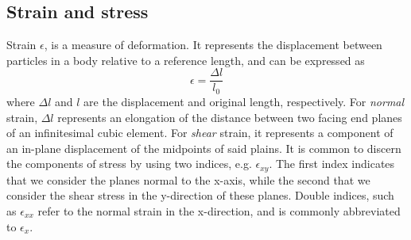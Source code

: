 \documentclass[twoside,english]{uiofysmaster}
\begin{document}
\subsection{Strain and stress}
Strain $\epsilon$, is a measure of deformation. 
It represents the displacement between particles in a body relative to a reference length, and can be expressed as
\begin{equation}
	\epsilon = \frac{\Delta l}{l_0}
\end{equation}
where $\Delta l$ and $l$ are the displacement and original length, respectively. 
For \textit{normal} strain, $\Delta l$ represents an elongation of the distance between two facing end planes of an infinitesimal cubic element.
For \textit{shear} strain, it represents a component of an in-plane displacement of the midpoints of said plains.
It is common to discern the components of stress by using two indices, e.g. $\epsilon_{xy}$.
The first index indicates that we consider the planes normal to the x-axis, while the second that we consider the shear stress in the y-direction of these planes. 
Double indices, such as $\epsilon_{xx}$ refer to the normal strain in the x-direction, and is commonly abbreviated to   $\epsilon_{x}$.
\end{document}
